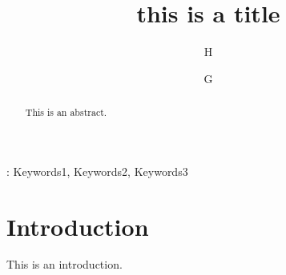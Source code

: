 \documentclass[a4paper]{article}
\let\oldincludegraphics\includegraphics
\renewcommand{\includegraphics}[2][]{
    \oldincludegraphics[scale=1, #1]{#2}
} %
\begin{document}
\title{this is a title}

\author[1]{H}
\author[2]{G}


\maketitle

\begin{abstract}

This is an abstract.

\end{abstract}

: Keywords1, Keywords2, Keywords3

\section{Introduction}

This is an introduction.


% 
% 
\end{document}
